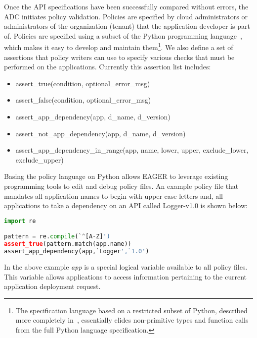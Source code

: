 Once the API specifications have been successfully compared without errors,
the ADC initiates policy validation. Policies are specified by cloud
administrators or administrators of the organization (tenant) that the
application developer is part of. Policies are specified using a subset of the
Python programming language~\cite{XXXportingeffortpaperXXX}, 
which makes it easy to develop and maintain them\footnote{The 
specification language based on a restricted subset of Python,
described more completely in~\cite{XXXportingeffortpaperXXX}, essentially
elides non-primitive types and function calls from the full Python
language specification.}.
We also define a set of assertions
that policy writers can use to specify various checks that must be performed
on the applications. 
Currently this assertion list includes:
\begin{itemize}
\item assert\_true(condition, optional\_error\_msg)
\item assert\_false(condition, optional\_error\_msg)
\item assert\_app\_dependency(app, d\_name, d\_version)
\item assert\_not\_app\_dependency(app, d\_name, d\_version)
\item assert\_app\_dependency\_in\_range(app, name, lower, upper, exclude\_lower, exclude\_upper)
\end{itemize}

Basing the policy language on Python allows EAGER to leverage
existing programming tools to edit and debug policy files. An example policy
file that mandates all application names to begin with upper case letters and,
all applications to take a dependency on an API called Logger-v1.0 is shown
below:

\begin{lstlisting}[language=Python, frame=single]
import re

pattern = re.compile(`^[A-Z]')
assert_true(pattern.match(app.name))
assert_app_dependency(app,`Logger',`1.0')
\end{lstlisting}

In the above example \textit{app} is a special logical variable available to
all policy files. This variable allows applications to access information
pertaining to the current application deployment request. 

